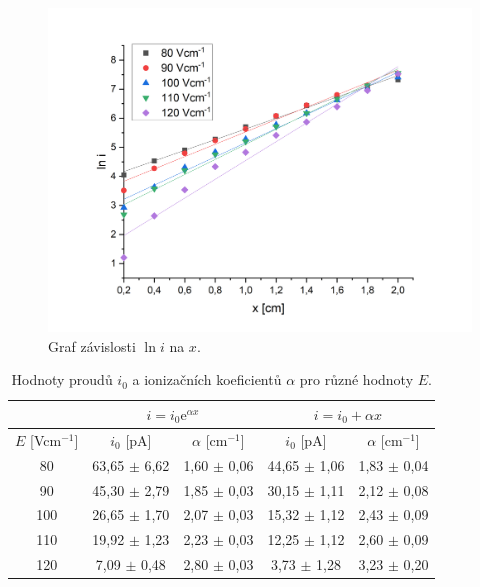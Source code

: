\documentclass[a4paper,12pt]{article}
\newcommand{\e}{\text{e}}
\begin{document}
\begin{figure}[h!]
	\centering
	\includegraphics[width=145mm]{lni.png}
	\caption{Graf závislosti $\ln i$ na $x$.}
	\label{lni}
\end{figure}


\begin{center}
	\begin{table}[h]
		\centering
		\caption{Hodnoty proudů $i_0$ a ionizačních koeficientů $\alpha$ pro různé hodnoty $E$.}
		\label{tab1}
		\begin{tabular}{|c|c|c|c|c|} \hline
			\multicolumn{1}{|c|}{}  & \multicolumn{2}{c|}{$i = i_0 \e^{\alpha 
			x}$}& \multicolumn{2}{c|}{$i = i_0 + \alpha x$}  \\ \hline
			$E$ [Vcm$^{-1}$] & $i_0$ [pA] & $\alpha$ [cm$^{-1}$] & $i_0$ [pA] & $\alpha$ [cm$^{-1}$] \\ \hline
			80 & 63,65 $\pm$ 6,62 & 1,60 $\pm$ 0,06 & 44,65 $\pm$ 1,06 & 1,83 $\pm$ 0,04\\ \hline
			90 & 45,30 $\pm$ 2,79 & 1,85 $\pm$ 0,03& 30,15 $\pm$ 1,11 & 2,12 $\pm$ 0,08\\ \hline
			100 & 26,65 $\pm$ 1,70 & 2,07 $\pm$ 0,03 & 15,32 $\pm$ 1,12 & 2,43 $\pm$ 0,09\\ \hline
			110 & 19,92 $\pm$ 1,23 & 2,23 $\pm$ 0,03 & 12,25 $\pm$ 1,12 & 2,60 $\pm$ 0,09 \\ \hline
			120 & 7,09 $\pm$ 0,48 & 2,80 $\pm$ 0,03 & 3,73 $\pm$ 1,28 & 3,23 $\pm$ 0,20 \\ \hline
			
		\end{tabular}
	\end{table}
\end{center}
\end{document}
